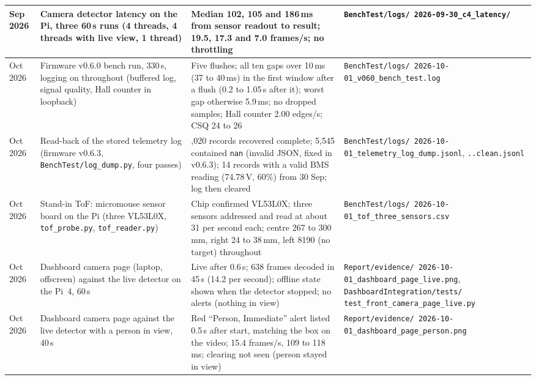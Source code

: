 \begin{longtable}{|>{\raggedright\arraybackslash}p{1.7cm}|>{\raggedright\arraybackslash}p{3.6cm}|>{\raggedright\arraybackslash}p{5.2cm}|>{\raggedright\arraybackslash}p{3.6cm}|}
30 Sep 2026 & Camera detector latency on the Pi, three 60\,s runs (4 threads, 4 threads with live view, 1 thread) & Median 102, 105 and 186\,ms from sensor readout to result; 19.5, 17.3 and 7.0 frames/s; no throttling & \texttt{BenchTest/\allowbreak{}logs/\allowbreak{} 2026-09-30\_\allowbreak{}c4\_\allowbreak{}latency/} \\ \hline
1 Oct 2026 & Firmware v0.6.0 bench run, 330\,s, logging on throughout (buffered log, signal quality, Hall counter in loopback) & Five flushes; all ten gaps over 10\,ms (37 to 40\,ms) in the first window after a flush (0.2 to 1.05\,s after it); worst gap otherwise 5.9\,ms; no dropped samples; Hall counter 2.00 edges/s; CSQ 24 to 26 & \texttt{BenchTest/\allowbreak{}logs/\allowbreak{} 2026-10-01\_\allowbreak{}v060\_\allowbreak{}bench\_\allowbreak{}test.log} \\ \hline
1 Oct 2026 & Read-back of the stored telemetry log (firmware v0.6.3, \texttt{BenchTest/log\_dump.py}, four passes) & 6,020 records recovered complete; 5,545 contained \texttt{nan} (invalid JSON, fixed in v0.6.3); 14 records with a valid BMS reading (74.78\,V, 60\%) from 30 Sep; log then cleared & \texttt{BenchTest/\allowbreak{}logs/\allowbreak{} 2026-10-01\_\allowbreak{}telemetry\_\allowbreak{}log\_\allowbreak{}dump.jsonl}, \texttt{..clean.jsonl} \\ \hline
1 Oct 2026 & Stand-in ToF: micromouse sensor board on the Pi (three VL53L0X, \texttt{tof\_probe.py}, \texttt{tof\_reader.py}) & Chip confirmed VL53L0X; three sensors addressed and read at about 31 per second each; centre 267 to 300\,mm, right 24 to 38\,mm, left 8190 (no target) throughout & \texttt{BenchTest/\allowbreak{}logs/\allowbreak{} 2026-10-01\_\allowbreak{}tof\_\allowbreak{}three\_\allowbreak{}sensors.csv} \\ \hline
1 Oct 2026 & Dashboard camera page (laptop, offscreen) against the live detector on the Pi~4, 60\,s & Live after 0.6\,s; 638 frames decoded in 45\,s (14.2 per second); offline state shown when the detector stopped; no alerts (nothing in view) & \texttt{Report/\allowbreak{}evidence/\allowbreak{} 2026-10-01\_\allowbreak{}dashboard\_\allowbreak{}page\_\allowbreak{}live.png}, \texttt{Dashboard\allowbreak{}Integration/\allowbreak{}tests/\allowbreak{} test\_\allowbreak{}front\_\allowbreak{}camera\_\allowbreak{}page\_\allowbreak{}live.py} \\ \hline
1 Oct 2026 & Dashboard camera page against the live detector with a person in view, 40\,s & Red ``Person, Immediate'' alert listed 0.5\,s after start, matching the box on the video; 15.4 frames/s, 109 to 118\,ms; clearing not seen (person stayed in view) & \texttt{Report/\allowbreak{}evidence/\allowbreak{} 2026-10-01\_\allowbreak{}dashboard\_\allowbreak{}page\_\allowbreak{}person.png} \\ \hline

\end{longtable}
